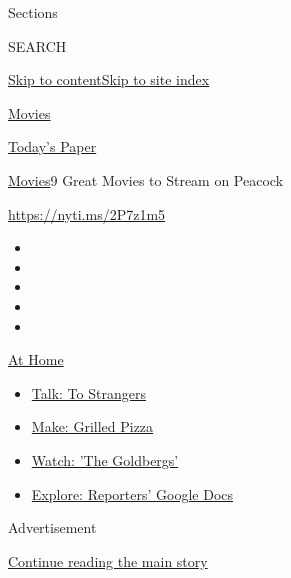 Sections

SEARCH

\protect\hyperlink{site-content}{Skip to
content}\protect\hyperlink{site-index}{Skip to site index}

\href{https://www.nytimes.com/section/movies}{Movies}

\href{https://myaccount.nytimes.com/auth/login?response_type=cookie\&client_id=vi}{}

\href{https://www.nytimes.com/section/todayspaper}{Today's Paper}

\href{/section/movies}{Movies}\textbar{}9 Great Movies to Stream on
Peacock

\url{https://nyti.ms/2P7z1m5}

\begin{itemize}
\item
\item
\item
\item
\item
\end{itemize}

\href{https://www.nytimes.com/spotlight/at-home?action=click\&pgtype=Article\&state=default\&region=TOP_BANNER\&context=at_home_menu}{At
Home}

\begin{itemize}
\tightlist
\item
  \href{https://www.nytimes.com/2020/08/03/well/family/the-benefits-of-talking-to-strangers.html?action=click\&pgtype=Article\&state=default\&region=TOP_BANNER\&context=at_home_menu}{Talk:
  To Strangers}
\item
  \href{https://www.nytimes.com/2020/08/01/at-home/coronavirus-make-pizza-on-a-grill.html?action=click\&pgtype=Article\&state=default\&region=TOP_BANNER\&context=at_home_menu}{Make:
  Grilled Pizza}
\item
  \href{https://www.nytimes.com/2020/07/31/arts/television/goldbergs-abc-stream.html?action=click\&pgtype=Article\&state=default\&region=TOP_BANNER\&context=at_home_menu}{Watch:
  'The Goldbergs'}
\item
  \href{https://www.nytimes.com/interactive/2020/at-home/even-more-reporters-editors-diaries-lists-recommendations.html?action=click\&pgtype=Article\&state=default\&region=TOP_BANNER\&context=at_home_menu}{Explore:
  Reporters' Google Docs}
\end{itemize}

Advertisement

\protect\hyperlink{after-top}{Continue reading the main story}

